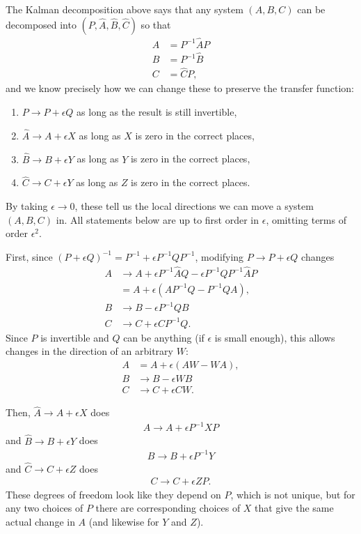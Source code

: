 The Kalman decomposition above says that any system $(A,B,C)$ can be decomposed into
$(P, \hat A, \hat B, \hat C)$ so that
$$\begin{aligned}
    A &= P^{-1} \hat A P  \\
    B &= P^{-1} \hat B  \\
    C &= \hat C P ,
\end{aligned}$$
and we know precisely how we can change these to preserve the transfer function:
\begin{enumerate}
    \item $P \to P + \epsilon Q$ as long as the result is still invertible,
    \item $\hat A \to A + \epsilon X$ as long as $X$ is zero in the correct places,
    \item $\hat B \to B + \epsilon Y$ as long as $Y$ is zero in the correct places,
    \item $\hat C \to C + \epsilon Y$ as long as $Z$ is zero in the correct places.
\end{enumerate}
By taking $\epsilon \to 0$, these tell us the local directions we can move a system $(A,B,C)$ in.
All statements below are up to first order in $\epsilon$,
omitting terms of order $\epsilon^2$.

First, since $(P + \epsilon Q)^{-1} = P^{-1} + \epsilon P^{-1} Q P^{-1}$,
modifying $P \to P + \epsilon Q$ changes
$$\begin{aligned}
    A 
        &\to A + \epsilon P^{-1} \hat A Q - \epsilon P^{-1} Q P^{-1} \hat A P \\
        &= A + \epsilon \left(A P^{-1} Q - P^{-1} Q A\right) , \\
    B
        &\to B - \epsilon P^{-1} Q B \\
    C
        &\to C + \epsilon C P^{-1} Q .
\end{aligned}$$
Since $P$ is invertible and $Q$ can be anything (if $\epsilon$ is small enough),
this allows changes in the direction of an arbitrary $W$:
$$\begin{aligned}
    A 
        &= A + \epsilon \left(A W - W A\right) , \\
    B
        &\to B - \epsilon W B \\
    C
        &\to C + \epsilon C W .
\end{aligned}$$

Then, $\hat A \to A + \epsilon X$  does
$$\begin{aligned}
    A \to A + \epsilon P^{-1} X P 
\end{aligned}$$
and $\hat B \to B + \epsilon Y$ does
$$\begin{aligned}
    B \to B + \epsilon P^{-1} Y
\end{aligned}$$
and $\hat C \to C + \epsilon Z$ does
$$\begin{aligned}
    C \to C + \epsilon Z P .
\end{aligned}$$
These degrees of freedom look like they depend on $P$, 
which is not unique,
but for any two choices of $P$ there are corresponding choices of $X$
that give the same actual change in $A$ (and likewise for $Y$ and $Z$).


